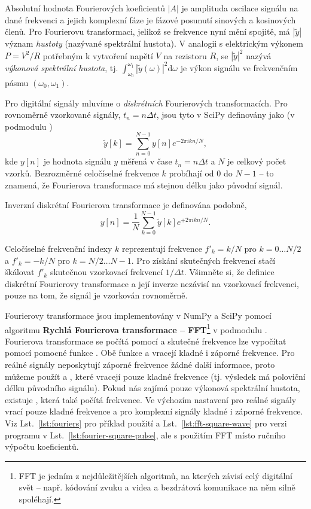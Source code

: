Absolutní hodnota Fourierových koeficientů $|A|$ je amplituda oscilace signálu na dané frekvenci a jejich komplexní fáze je fázové posunutí sinových a kosinových členů. Pro Fourierovu transformaci, jelikož se frekvence nyní mění spojitě, má $|\tilde y|$ význam \emph{hustoty} (nazývané spektrální hustota). V analogii s elektrickým výkonem $P = V^2/R$ potřebným k vytvoření napětí $V$ na rezistoru $R$, se $|\tilde y|^2$ nazývá \emph{výkonová spektrální hustota}, tj. $\int_{\omega_0}^{\omega_1} |\tilde y (\omega)|^2\mathrm{d}\omega$ je výkon signálu ve frekvenčním pásmu $(\omega_0, \omega_1)$.

Pro digitální signály mluvíme o \emph{diskrétních} Fourierových transformacích. Pro rovnoměrně vzorkované signály, $t_n = n\Delta t$, jsou tyto v SciPy definovány jako (v podmodulu )
\begin{equation}
    \tilde y[k] = \sum_{n=0}^{N-1}y[n]e^{-2\pi i kn/N},
\end{equation}
kde $y[n]$ je hodnota signálu $y$ měřená v čase $t_n = n\Delta t$ a $N$ je celkový počet vzorků. Bezrozměrné celočíselné frekvence $k$ probíhají od 0 do $N-1$ -- to znamená, že Fourierova transformace má stejnou délku jako původní signál.

Inverzní diskrétní Fourierova transformace je definována podobně,
\begin{equation}
    y[n] = \frac{1}{N}\sum_{k=0}^{N-1}\tilde y[k]e^{+2\pi i kn/N}.
\end{equation}

Celočíselné frekvenční indexy $k$ reprezentují frekvence $f'_k = k/N$ pro $k=0\dots N/2$ a $f'_k = -k/N$ pro $k=N/2\dots N-1$. Pro získání skutečných frekvencí stačí škálovat $f'_k$ skutečnou vzorkovací frekvencí $1/\Delta t$. Všimněte si, že definice diskrétní Fourierovy transformace a její inverze nezávisí na vzorkovací frekvenci, pouze na tom, že signál je vzorkován rovnoměrně.

Fourierovy transformace jsou implementovány v NumPy a SciPy pomocí algoritmu \textbf{Rychlá Fourierova transformace -- FFT}\footnote{FFT je jedním z nejdůležitějších algoritmů, na kterých závisí celý digitální svět -- např. kódování zvuku a videa a bezdrátová komunikace na něm silně spoléhají.} v podmodulu . Fourierova transformace se počítá pomocí  a skutečné frekvence lze vypočítat pomocí pomocné funkce . Obě funkce  a  vracejí kladné i záporné frekvence. Pro reálné signály neposkytují záporné frekvence žádné další informace, proto můžeme použít  a , které vracejí pouze kladné frekvence (tj. výsledek má poloviční délku původního signálu). Pokud nás zajímá pouze výkonová spektrální hustota, existuje , která také počítá frekvence. Ve výchozím nastavení pro reálné signály vrací  pouze kladné frekvence a pro komplexní signály kladné i záporné frekvence. Viz Lst.~\ref{lst:fouriers} pro příklad použití a Lst.~\ref{lst:fft-square-wave} pro verzi programu v Lst.~\ref{lst:fourier-square-pulse}, ale s použitím FFT místo ručního výpočtu koeficientů.

